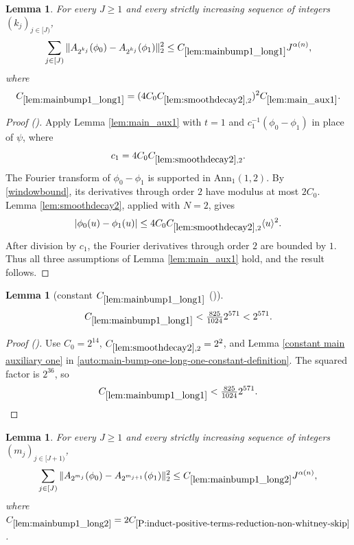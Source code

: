 \documentclass[12pt,reqno]{amsart}
\newcommand{\auto}{{({\tiny\faCar})}}
\theoremstyle{plain}
\newtheorem{lemma}[theorem]{Lemma}
\numberwithin{equation}{section}
\theoremstyle{remark}
\newcommand{\using}[1]{}
\begin{document}
\begin{lemma}\label{lem:mainbump1_long1}\using{lem:main_aux1}\using{lem:smoothdecay2}
For every $J\ge1$ and every strictly increasing sequence of integers $(k_j)_{j\in[J)}$,
\begin{equation}\label{mainbump1_long1}
\sum_{j\in[J)}\|A_{2^{k_j}}(\phi_0)-A_{2^{k_j}}(\phi_1)\|_2^2
\le C_{\ref{lem:mainbump1_long1}}J^{\alpha(n)},
\end{equation}
where
\begin{equation}\label{auto:main-bump-one-long-one-constant-definition}
C_{\ref{lem:mainbump1_long1}}
=(4C_0C_{\ref{lem:smoothdecay2},2})^2C_{\ref{lem:main_aux1}}.
\end{equation}
\end{lemma}

\begin{proof}[Proof \auto]
Apply Lemma \ref{lem:main_aux1} with $t=1$ and $c_1^{-1}(\phi_0-\phi_1)$ in place of $\psi$, where
\[
c_1=4C_0C_{\ref{lem:smoothdecay2},2}.
\]
The Fourier transform of $\phi_0-\phi_1$ is supported in $\mathrm{Ann}_1(1,2)$. By \eqref{windowbound}, its derivatives through order $2$ have modulus at most $2C_0$. Lemma \ref{lem:smoothdecay2}, applied with $N=2$, gives
\[
|\phi_0(u)-\phi_1(u)|
\le4C_0C_{\ref{lem:smoothdecay2},2}\langle u\rangle^2.
\]
After division by $c_1$, the Fourier derivatives through order $2$ are bounded by $1$. Thus all three assumptions of Lemma \ref{lem:main_aux1} hold, and the result follows.
\end{proof}

\begin{lemma}[constant $C_{\ref{lem:mainbump1_long1}}$ \auto]\label{constant main bump one long one}\using{lem:smoothdecay2}\using{constant main auxiliary one}\using{lem:mainbump1_long1}
\begin{equation}\label{constant main bump one long one bound}
C_{\ref{lem:mainbump1_long1}}<\tfrac{825}{1024}2^{571}<2^{571}.
\end{equation}
\end{lemma}
\begin{proof}[Proof \auto]
Use $C_0=2^{14}$, $C_{\ref{lem:smoothdecay2},2}=2^2$, and Lemma \ref{constant main auxiliary one} in \eqref{auto:main-bump-one-long-one-constant-definition}. The squared factor is $2^{36}$, so
\[
C_{\ref{lem:mainbump1_long1}}
<\tfrac{825}{1024}2^{571}.
\]
\end{proof}

\begin{lemma}\label{lem:mainbump1_long2}\using{Extension of sequences}\using{A to Lambda}\using{P:induct-positive-terms-reduction-non-whitney-skip}\using{Operations on spaced sequences}
For every $J\ge 1$ and every strictly increasing sequence of integers $(m_j)_{j\in[J+1)}$,
\begin{equation}\label{mainbump1_long2}
\sum_{j\in[J)} \|
A_{2^{m_{j}}}(\phi_0)-A_{2^{m_{j+1}}}(\phi_1) \|_{2}^2  \le C_{\ref{lem:mainbump1_long2}} J^{\alpha(n)},\end{equation}
where $C_{\ref{lem:mainbump1_long2}}=2 C_{\ref{P:induct-positive-terms-reduction-non-whitney-skip}}$.
\end{lemma}
\end{document}
